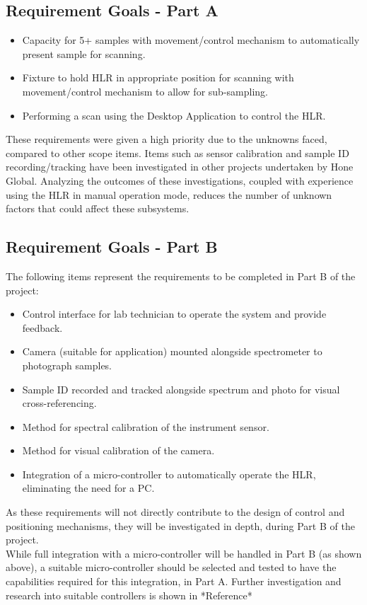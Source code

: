 \documentclass{UoNMCHA}
\numberwithin{equation}{section}
\begin{document}
\subsection{Requirement Goals - Part A}
\begin{itemize}
	\item Capacity for 5+ samples with movement/control mechanism to automatically present sample for scanning.
	\item Fixture to hold HLR in appropriate position for scanning with movement/control mechanism to allow for sub-sampling.
	\item Performing a scan using the Desktop Application to control the HLR.
\end{itemize}
These requirements were given a high priority due to the unknowns faced, compared to other scope items. Items such as sensor calibration and sample ID recording/tracking have been investigated in other projects undertaken by Hone Global. Analyzing the outcomes of these investigations, coupled with experience using the HLR in manual operation mode, reduces the number of unknown factors that could affect these subsystems.\\
\subsection{Requirement Goals - Part B}
The following items represent the requirements to be completed in Part B of the project:
\begin{itemize}
	\item Control interface for lab technician to operate the system and provide feedback.
	\item Camera (suitable for application) mounted alongside spectrometer to photograph samples.
	\item Sample ID recorded and tracked alongside spectrum and photo for visual cross-referencing.
	\item Method for spectral calibration of the instrument sensor.
	\item Method for visual calibration of the camera.
	\item Integration of a micro-controller to automatically operate the HLR, eliminating the need for a PC.
\end{itemize}
As these requirements will not directly contribute to the design of control and positioning mechanisms, they will be investigated in depth, during Part B of the project. \\
While full integration with a micro-controller will be handled in Part B (as shown above), a suitable micro-controller should be selected and tested to have the capabilities required for this integration, in Part A. Further investigation and research into suitable controllers is shown in *Reference*   
\newpage
\end{document}
